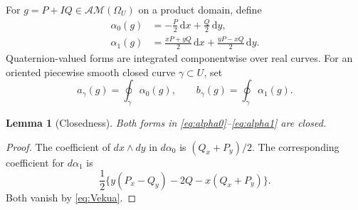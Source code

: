 \documentclass[11pt,a4paper]{article}
\numberwithin{equation}{section}
\newtheorem{lemma}[theorem]{Lemma}
\theoremstyle{definition}
\theoremstyle{remark}
\newcommand{\AM}{\mathcal{AM}}
\newcommand{\dd}{\,\mathrm d}
\begin{document}
For $g=P+IQ\in\AM(\Omega_U)$ on a product domain, define
\begin{align}
 \alpha_0(g)&=-\frac{P}{2}\dd x+\frac{Q}{2}\dd y,
 \label{eq:alpha0}\\
 \alpha_1(g)&=\frac{xP+yQ}{2}\dd x+
              \frac{yP-xQ}{2}\dd y.
 \label{eq:alpha1}
\end{align}
Quaternion-valued forms are integrated componentwise over real curves.
For an oriented piecewise smooth closed curve $\gamma\subset U$, set
\begin{equation}\label{eq:period-def}
 a_\gamma(g)=\oint_\gamma\alpha_0(g),\qquad
 b_\gamma(g)=\oint_\gamma\alpha_1(g).
\end{equation}

\begin{lemma}[Closedness]\label{lem:closed}
Both forms in \eqref{eq:alpha0}--\eqref{eq:alpha1} are closed.
\end{lemma}
\begin{proof}
The coefficient of $dx\wedge dy$ in $d\alpha_0$ is $(Q_x+P_y)/2$.
The corresponding coefficient for $d\alpha_1$ is
\[
 \frac12\{y(P_x-Q_y)-2Q-x(Q_x+P_y)\}.
\]
Both vanish by \eqref{eq:Vekua}.
\end{proof}
\end{document}
